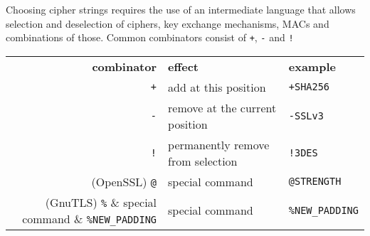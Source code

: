 Choosing cipher strings requires the use of an intermediate language that allows selection
and deselection of ciphers, key exchange mechanisms, MACs and combinations of those.
Common combinators consist of \texttt{+}, \texttt{-} and \texttt{!}
\begin{center}

\begin{tabular}{rll}
\toprule
\textbf{combinator} & \textbf{effect}                   & \textbf{example}\\\cmidrule(lr){1-3}
           \verb|+| & add at this position              & \verb|+SHA256|      \\
           \verb|-| & remove at the current position    & \verb|-SSLv3|       \\
           \verb|!| & permanently remove from selection & \verb|!3DES|        \\
 (OpenSSL) \verb|@| & special command                   & \verb|@STRENGTH|    \\
  (GnuTLS) \verb|%| & special command                   & \verb|%NEW_PADDING| \\
\bottomrule
\end{tabular}
\end{center}



%
%
%
%
%
%
%
%
%

